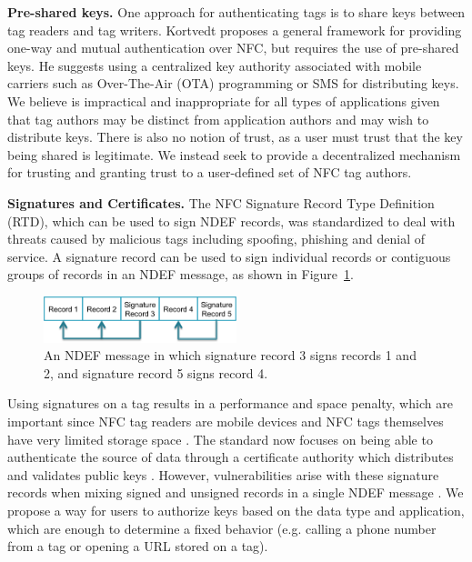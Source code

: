 \documentclass[12pt]{article}
\begin{document}
\textbf{Pre-shared keys.}
One approach for authenticating tags is to share keys between tag readers and tag writers.
Kortvedt \cite{kortvedt2009} proposes a general framework for providing one-way and mutual authentication over NFC, but requires the use of pre-shared keys.
He suggests using a centralized key authority associated with mobile carriers such as Over-The-Air (OTA) programming or SMS for distributing keys.
We believe is impractical and inappropriate for all types of applications given that tag authors may be distinct from application authors and may wish to distribute keys.
There is also no notion of trust, as a user must trust that the key being shared is legitimate.
We instead seek to provide a decentralized mechanism for trusting and granting trust to a user-defined set of NFC tag authors.

\textbf{Signatures and Certificates.}
The NFC Signature Record Type Definition (RTD), which can be used to sign NDEF records, was standardized to deal with threats caused by malicious tags including spoofing, phishing and denial of service.
A signature record can be used to sign individual records or contiguous groups of records in an NDEF message, as shown in Figure~\ref{fig:relatedwork:signature}.
\begin{figure}[h!]
\begin{minipage}{\textwidth}
	\centering
		\includegraphics[width=0.5\textwidth]{signed_ndef.png}
	\caption[Caption for LOF]%
  {An NDEF message in which signature record 3 signs records 1 and 2, and signature record 5 signs record 4.}
  \label{fig:relatedwork:signature}

\end{minipage} 
\end{figure}

Using signatures on a tag results in a performance and space penalty, which are important since NFC tag readers are mobile devices and NFC tags themselves have very limited storage space \cite{kilas2009}.
The standard now focuses on being able to authenticate the source of data through a certificate authority which distributes and validates public keys \cite{rosati2011}.
However, vulnerabilities arise with these signature records when mixing signed and unsigned records in a single NDEF message \cite{roland2010,roland2011}.
We propose a way for users to authorize keys based on the data type and application, which are enough to determine a fixed behavior (e.g. calling a phone number from a tag or opening a URL stored on a tag).
\end{document}
